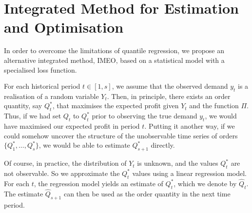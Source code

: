 \documentclass{article}
\begin{document}
\section{Integrated Method for Estimation and Optimisation} \label{se:new}

In order to overcome the limitations of quantile regression, we propose an alternative integrated method, IMEO, based on a statistical model with a specialised loss function.

For each historical period $t\in [1,s]$, we assume that the observed demand $y_t$ is a realisation of a random variable $Y_t$. Then, in principle, there exists an order quantity, say $Q_t^*$, that maximises the expected profit given $Y_t$ and the function $\Pi$. Thus, if we had set $Q_t$ to $Q_t^*$ prior to observing the true demand $y_t$, we would have maximised our expected profit in period $t$. Putting it another way, if we could somehow uncover the structure of the unobservable time series of orders $\big\{ Q_1^*,\dots,Q_s^* \big\}$, we would be able to estimate $Q_{s+1}^*$ directly.

Of course, in practice, the distribution of $Y_t$ is unknown, and the values $Q_t^*$ are not observable. So we approximate the $Q_t^*$ values using a linear regression model. For each $t$, the regression model yields an estimate of $Q^*_t$, which we denote by $\hat{Q}_t$. The estimate $\hat{Q}_{s+1}$ can then be used as the order quantity in the next time period.
\end{document}

